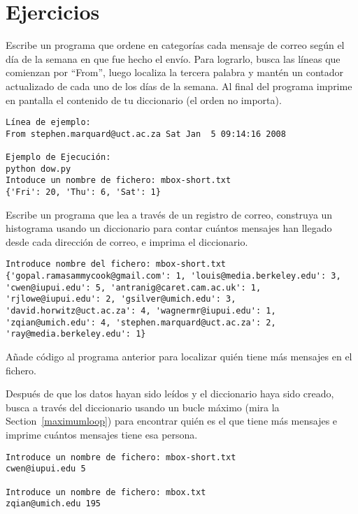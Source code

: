 \section{Ejercicios}

\begin{ex}
Escribe un programa que ordene en categorías cada mensaje de correo según
el día de la semana en que fue hecho el envío. Para lograrlo, busca
las líneas que comienzan por ``From'', luego localiza la
tercera palabra y mantén un contador actualizado de cada uno
de los días de la semana. Al final del programa imprime en pantalla
el contenido de tu diccionario (el orden no importa).

\beforeverb
\begin{verbatim}
Línea de ejemplo:
From stephen.marquard@uct.ac.za Sat Jan  5 09:14:16 2008

Ejemplo de Ejecución:
python dow.py
Intoduce un nombre de fichero: mbox-short.txt
{'Fri': 20, 'Thu': 6, 'Sat': 1}
\end{verbatim}
\afterverb
\end{ex}

\begin{ex}
Escribe un programa que lea a través de un registro de correo,
construya un histograma usando un diccionario para contar cuántos
mensajes han llegado desde cada dirección de correo,
e imprima el diccionario.

\beforeverb
\begin{verbatim}
Introduce nombre del fichero: mbox-short.txt
{'gopal.ramasammycook@gmail.com': 1, 'louis@media.berkeley.edu': 3, 
'cwen@iupui.edu': 5, 'antranig@caret.cam.ac.uk': 1, 
'rjlowe@iupui.edu': 2, 'gsilver@umich.edu': 3, 
'david.horwitz@uct.ac.za': 4, 'wagnermr@iupui.edu': 1, 
'zqian@umich.edu': 4, 'stephen.marquard@uct.ac.za': 2, 
'ray@media.berkeley.edu': 1}
\end{verbatim}
\afterverb
\end{ex}

\begin{ex}
Añade código al programa anterior para localizar quién
tiene más mensajes en el fichero.

Después de que los datos hayan sido leídos y el diccionario haya
sido creado, busca a través del diccionario usando un bucle máximo
(mira la Section~\ref{maximumloop})
para encontrar quién es el que tiene más
mensajes e imprime cuántos mensajes tiene esa persona.

\beforeverb
\begin{verbatim}
Introduce un nombre de fichero: mbox-short.txt
cwen@iupui.edu 5

Introduce un nombre de fichero: mbox.txt
zqian@umich.edu 195
\end{verbatim}
\afterverb
\end{ex}

